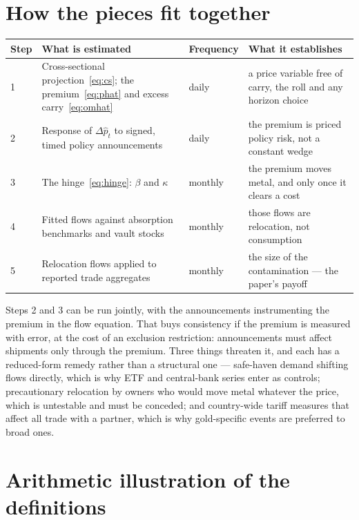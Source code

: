 \documentclass[11pt,a4paper]{article}
\newcommand{\phat}{\widehat{p}_t}
\begin{document}
\section{How the pieces fit together}
\label{sec:chain}

\begin{center}
\begin{tabular}{@{}p{}p{}p{}p{}@{}}
\toprule
\textbf{Step} & \textbf{What is estimated} & \textbf{Frequency} & \textbf{What it establishes} \\
\midrule
1 & Cross-sectional projection~\eqref{eq:cs}; the premium~\eqref{eq:phat} and
excess carry~\eqref{eq:omhat} & daily & a price variable free of carry, the
roll and any horizon choice \\
2 & Response of $\Delta\phat$ to signed, timed policy announcements & daily &
the premium is priced policy risk, not a constant wedge \\
3 & The hinge~\eqref{eq:hinge}: $\beta$ and $\kappa$ & monthly & the premium
moves metal, and only once it clears a cost \\
4 & Fitted flows against absorption benchmarks and vault stocks & monthly &
those flows are relocation, not consumption \\
5 & Relocation flows applied to reported trade aggregates & monthly & the size
of the contamination --- the paper's payoff \\
\bottomrule
\end{tabular}
\end{center}

Steps 2 and 3 can be run jointly, with the announcements instrumenting the
premium in the flow equation. That buys consistency if the premium is measured
with error, at the cost of an exclusion restriction: announcements must affect
shipments only through the premium. Three things threaten it, and each has a
reduced-form remedy rather than a structural one --- safe-haven demand shifting
flows directly, which is why ETF and central-bank series enter as controls;
precautionary relocation by owners who would move metal whatever the price,
which is untestable and must be conceded; and country-wide tariff measures that
affect all trade with a partner, which is why gold-specific events are
preferred to broad ones.

\section{Arithmetic illustration of the definitions}
\label{sec:illustration}
\end{document}
